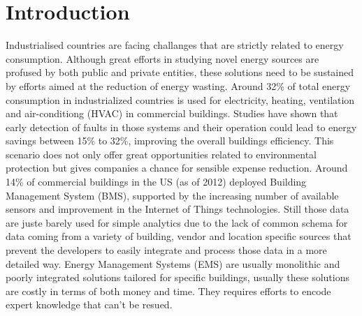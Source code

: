 \chapter*{Introduction}
\label{ch:introduction}
Industrialised countries are facing challanges that are strictly related to energy consumption. Although great efforts in studying novel energy sources are profused by both public and private entities, these solutions need to be sustained by efforts aimed at the reduction of energy wasting. Around 32\% of total energy consumption in industrialized countries is used for electricity, heating, ventilation and air-conditiong (HVAC) in commercial buildings. Studies have shown that early detection of faults in those systems and their operation could lead to energy savings between 15\% to 32\%, improving the overall buildings efficiency. This scenario does not only offer great opportunities related to environmental protection but gives companies a chance for sensible expense reduction. Around 14\% of commercial buildings in the US (as of 2012) deployed Building Management System (BMS), supported by the increasing number of available sensors and improvement in the Internet of Things technologies. Still those data are juste barely used for simple analytics due to the lack of common schema for data coming from a variety of building, vendor and location specific sources that prevent the developers to easily integrate and process those data in a more detailed way. Energy Management Systems (EMS) are usually monolithic and poorly integrated solutions tailored for specific buildings, usually these solutions are costly in terms of both money and time. They requires efforts to encode expert knowledge that can't be resued. 

